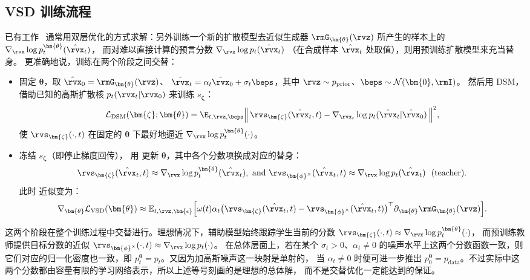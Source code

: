 \subsection{VSD 训练流程}\label{subsec:vsd-training}
已有工作~\citep{yin2024one,yin2024improved,pooledreamfusion,wang2023prolificdreamer,luo2023diff,lu2024simplifying}
通常用双层优化的方式求解：另外训练一个新的扩散模型去近似生成器 $\rmG_{\bm{\theta}}(\rvz)$ 所产生的样本上的
$\nabla_{\rvx} \log p_t^{\bm{\theta}}(\hat\rvx_t)$，
而对难以直接计算的预言分数 $\nabla_{\rvx} \log p_t(\hat\rvx_t)$
（在合成样本 $\hat\rvx_t$ 处取值），则用预训练扩散模型来充当替身。
更准确地说，训练在两个阶段之间交替：
\begin{itemize}
    \item {} 固定 $\bm{\theta}$，取
    $\hat{\rvx}_0=\rmG_{\bm{\theta}}(\rvz)$、
    $\hat{\rvx}_t=\alpha_t \hat{\rvx}_0+\sigma_t\beps$，其中
    $\rvz\sim p_{\mathrm{prior}}$、$\beps\sim\mathcal{N}(\bm{0},\rmI)$。
    然后用 DSM，借助已知的高斯扩散核 $p_t(\rvx_t|\rvx_0)$ 来训练 $s_{\bm{\zeta}}$：
    \[
    \mathcal{L}_{\text{DSM}}(\bm{\zeta};\bm{\theta})
    =\E_{t,\rvz,\beps}\Big\|\,\rvs_{\bm{\zeta}}(\hat{\rvx}_t,t)
    - \nabla_{\rvx_t}\log p_t(\hat{\rvx}_t|\hat{\rvx}_0)\,\Big\|^2,
    \]
    使 $\rvs_{\bm{\zeta}}(\cdot,t)$ 在固定的 $\bm{\theta}$ 下最好地逼近
    $\nabla_{\rvx}\log p_t^{\bm{\theta}}(\cdot)$。


  \item {} 冻结 $s_{\bm{\zeta}}$（即停止梯度回传），
  用  更新 $\bm{\theta}$，其中各个分数项换成对应的替身：
  \[
    \rvs_{\bm{\zeta}}(\hat\rvx_t,t)\approx \nabla_{\rvx}\log p_t^{\bm{\theta}}(\hat\rvx_t), \,\, \text{and} \,\, \rvs_{\bm{\phi}^\times}(\hat{\rvx}_t,t)\approx \nabla_{\rvx}\log p_t(\hat\rvx_t)\ \ \text{(teacher)}.
  \]
  此时  近似变为：
  \[
    \nabla_{\bm{\theta}}\mathcal{L}_{\text{VSD}}(\bm{\theta})
    \approx \mathbb{E}_{t,\rvz,\bm{\epsilon}}\Big[\omega(t)\alpha_t
      \big(\rvs_{\bm{\zeta}}(\hat{\rvx}_t,t) - \rvs_{\bm{\phi}^\times}(\hat{\rvx}_t,t)\big)^{\top}
      \partial_{\bm{\theta}}\rmG_{\bm{\theta}}(\rvz)
    \Big].
  \]
\end{itemize}
这两个阶段在整个训练过程中交替进行。理想情况下，辅助模型始终跟踪学生当前的分数 $\rvs_{\bm{\zeta}}(\cdot,t)\approx\nabla_{\rvx}\log p_t^{\bm{\theta}}(\cdot)$，
而预训练教师提供目标分数的近似
$\rvs_{\bm{\phi}^\times}(\cdot,t)\approx\nabla_{\rvx}\log p_t(\cdot)$。
在总体层面上，若在某个 $\sigma_t>0$、$\alpha_t\neq 0$ 的噪声水平上这两个分数函数一致，则它们对应的归一化密度也一致，即
$p_t^{\bm{\theta}}=p_t$。又因为加高斯噪声这一映射是单射的，
当 $\alpha_t\neq 0$ 时便可进一步推出
$p_0^{\bm{\theta}}=p_{\mathrm{data}}$。不过实际中这两个分数都由容量有限的学习网络表示，所以上述等号刻画的是理想的总体解，
而不是交替优化一定能达到的保证。


